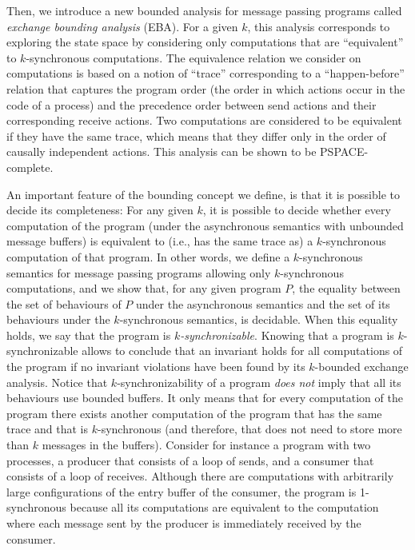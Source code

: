 Then, we introduce a new bounded analysis for message passing programs called {\em exchange bounding analysis} (EBA). For a given $k$, this analysis corresponds to exploring the state space by considering only computations that are “equivalent” to $k$-synchronous computations. The equivalence relation we consider on computations is based on a notion of “trace” corresponding to a “happen-before” relation that captures the program order (the order in which actions occur in the code of a process) and the precedence order between send actions and their corresponding receive actions. Two computations are considered to be equivalent if they have the same trace, which means that they differ only in the order of causally independent actions. This analysis can be shown to be PSPACE-complete. 
%

An important feature of the bounding concept we define, is that it is possible to decide its completeness: For any given $k$, it is possible to decide whether every computation of the program (under the asynchronous semantics with unbounded message buffers) is equivalent to (i.e., has the same trace as) a $k$-synchronous computation of that program. 
In other words, we define a $k$-synchronous semantics for message passing programs allowing only $k$-synchronous computations, and we show that, for any given program $P$, the equality between the set of behaviours of $P$ under the asynchronous semantics and the set of its behaviours under the $k$-synchronous semantics, is decidable. When this equality holds, we say that the program is {\em $k$-synchronizable}. Knowing that a program is $k$-synchronizable allows to conclude that an invariant holds for all computations of the program if no invariant violations have been found by its $k$-bounded exchange analysis. Notice that $k$-synchronizability of a program {\em does not} imply that all its behaviours use bounded buffers. It only means that for every computation of the program there exists another computation of the program that has the same trace and that is $k$-synchronous (and therefore, that does not need to store more than $k$ messages in the buffers). Consider for instance a program with two processes, a producer that consists of a loop of sends, and a consumer that consists of a loop of receives. Although there are computations with arbitrarily large configurations of the entry buffer of the consumer, the program is 1-synchronous because all its computations are equivalent to the computation where each message sent by the producer is immediately received by the consumer. 

